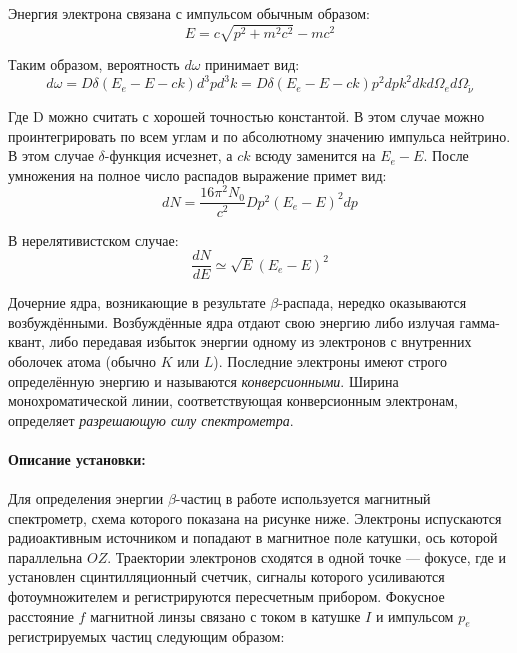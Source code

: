 \documentclass[a4paper,12pt]{article}
\begin{document}
		Энергия электрона связана с импульсом обычным образом:
		\begin{equation*}
		    E = c\sqrt{p^2 + m^2c^2} -mc^2
		\end{equation*}

		Таким образом, вероятность $d\omega$ принимает вид:
		\begin{equation*}
		    d\omega = D\delta(E_e-E-ck)d^3pd^3k = D\delta(E_e-E-ck)p^2d pk^2d kd\Omega_ed\Omega_{\widetilde{\nu}}
		\end{equation*}

		Где D можно считать с хорошей точностью константой. В этом случае можно проинтегрировать по всем углам и по абсолютному значению импульса нейтрино. В этом случае $\delta$-функция исчезнет, а $ck$ всюду заменится на $E_e-E$. После умножения на полное число распадов выражение примет вид:
		\begin{equation*}
		    d N = \frac{16\pi^2N_0}{c^2} D p^2\left(E_e-E\right)^2d p
		\end{equation*}

		В нерелятивистском случае:
		\begin{equation*}
			\frac{d N}{d E} \simeq \sqrt{E}(E_e - E)^2
		\end{equation*}

		
		Дочерние ядра, возникающие в результате $\beta$-распада, нередко оказываются возбуждёнными. Возбуждённые ядра отдают свою энергию либо излучая гамма-квант, либо передавая избыток энергии одному из электронов с внутренних оболочек атома (обычно $K$ или $L$). Последние электроны имеют строго определённую энергию и называются \textit{конверсионными}. Ширина монохроматической линии, соответствующая конверсионным электронам, определяет \textit{разрешающую силу спектрометра}.

\paragraph{Описание установки:}
\paragraph{}
Для определения энергии $\beta$-частиц в работе используется магнитный спектрометр, схема которого показана на рисунке ниже. Электроны испускаются радиоактивным источником и попадают в магнитное поле катушки, ось которой параллельна $OZ$. Траектории электронов сходятся в одной точке --- фокусе, где и установлен сцинтилляционный счетчик, сигналы которого усиливаются фотоумножителем и регистрируются пересчетным прибором. Фокусное расстояние $f$ магнитной линзы связано с током в катушке $I$ и импульсом $p_e$ регистрируемых частиц следующим образом:
	
\end{document}
